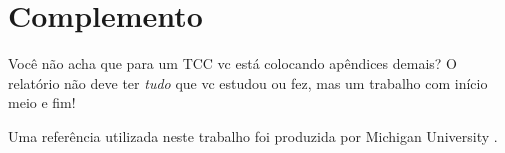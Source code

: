 \chapter{Complemento}

Você não acha que para um TCC vc está colocando apêndices demais? O
relatório não deve ter {\em tudo} que vc estudou ou fez, mas um trabalho
com início meio e fim!

Uma referência utilizada neste trabalho foi produzida por
Michigan University \citeyearpar{MU:14}.